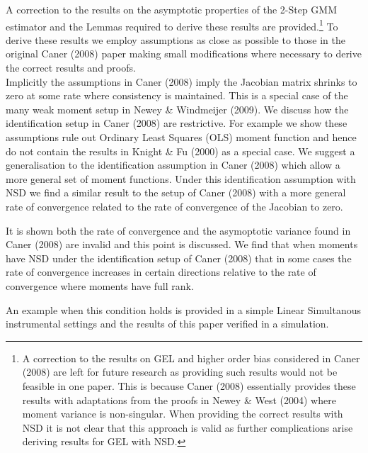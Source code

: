 \documentclass[11pt, fleqn]{article}
\begin{document}
 A correction to the results on the  asymptotic properties of the 2-Step GMM estimator and the Lemmas required to derive these results are provided.\footnote{ A correction to the results on GEL and higher order bias considered in Caner (2008) are left for future research as  providing such  results would not be feasible in one paper. This is because Caner (2008) essentially provides these results with  adaptations from the proofs in Newey \& West (2004) where moment variance  is non-singular. When providing the correct results with NSD it is not clear that this approach is valid as  further complications arise deriving results for GEL with NSD.}
	To derive these results we employ assumptions as close as possible to those in the original Caner (2008) paper making small modifications where necessary to derive the correct results and proofs.\\
	Implicitly the assumptions in Caner (2008) imply the Jacobian matrix shrinks to zero at some rate where consistency is maintained. This is a special case of the many weak moment setup in Newey \& Windmeijer (2009).
We discuss how the identification setup in Caner (2008)   are  restrictive. For example we show these assumptions rule out  Ordinary Least Squares (OLS) moment function and  hence do not contain the results in Knight \& Fu (2000) as a special case. We suggest a generalisation to the identification assumption in Caner (2008) which allow a more general set of moment functions. Under this identification assumption with NSD we find a similar result to the setup of Caner (2008) with a more general rate of convergence related to the rate of convergence of the Jacobian to zero.


It is shown both the rate of convergence and the asymoptotic variance found in Caner (2008) are invalid and this point is discussed.
We find that when moments have NSD under the identification setup of Caner (2008) that in some cases the rate of convergence increases in certain directions relative to the rate of convergence where moments have full rank. 

An example when this condition holds is provided in a simple Linear Simultanous instrumental settings and the results of this paper verified in a simulation.
\end{document}
